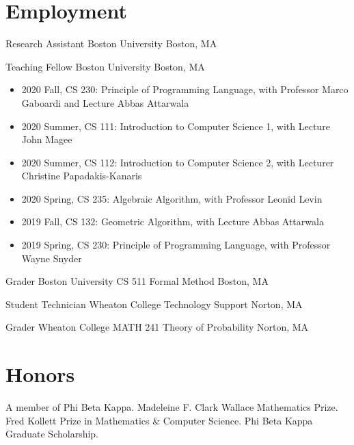 \documentclass[11pt,a4paper,roman]{moderncv}        %
\begin{document}
\section{Employment}

{Research Assistant}
{Boston University}
{Boston, MA}{}
{}

{Teaching Fellow}
{Boston University}
{Boston, MA}{}
{
  \begin{itemize}[nosep]
    \item 2020 Fall, CS 230: Principle of Programming Language,
      with Professor Marco Gaboardi and Lecture Abbas Attarwala
    \item 2020 Summer, CS 111: Introduction to Computer Science 1,
      with Lecture John Magee
    \item 2020 Summer, CS 112: Introduction to Computer Science 2,
      with Lecturer Christine Papadakis-Kanaris
    \item 2020 Spring, CS 235: Algebraic Algorithm,  
      with Professor Leonid Levin
    \item 2019 Fall, CS 132: Geometric Algorithm, 
      with Lecture Abbas Attarwala
    \item 2019 Spring, CS 230: Principle of Programming Language, 
      with Professor Wayne Snyder
  \end{itemize}
}

{Grader}
{Boston University CS 511 Formal Method}
{Boston, MA}{}{}

{Student Technician}
{Wheaton College Technology Support}
{Norton, MA}{}{}

{Grader}
{Wheaton College MATH 241 Theory of Probability}
{Norton, MA}{}{}



\section{Honors}
 {A member of Phi Beta Kappa.}
 {
  Madeleine F. Clark Wallace Mathematics Prize. \newline
  Fred Kollett Prize in Mathematics \& Computer Science. \newline
  Phi Beta Kappa Graduate Scholarship.
}
\end{document}
